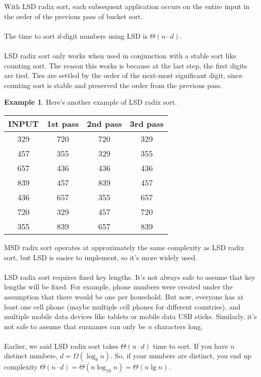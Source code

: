 \documentclass[]{article}
\theoremstyle{definition}
\newtheorem{ex}{Example}[section]
\begin{document}
					With LSD radix sort, each subsequent application occurs on the entire input in the order of the previous pass of bucket sort.
					\\ \\
					The time to sort $d$-digit numbers using LSD is $\Theta(n \cdot d)$.
					\\ \\
					LSD radix sort only works when used in conjunction with a stable sort like counting sort. The reason this works is because at the last step, the first digits are tied. Ties are settled by the order of the next-most significant digit, since counting sort is stable and preserved the order from the previous pass.
					\begin{ex} Here's another example of LSD radix sort. \\
						\begin{center}
							\begin{tabular}{|c|c|c|c|}
								\hline
								INPUT & 1st pass & 2nd pass & 3rd pass \\ \hline
								329 & 720 & 720 & 329 \\
								457 & 355 & 329 & 355 \\
								657 & 436 & 436 & 436 \\
								839 & 457 & 839 & 457 \\
								436 & 657 & 355 & 657 \\
								720 & 329 & 457 & 720 \\
								355 & 839 & 657 & 839 \\ \hline
							\end{tabular}
						\end{center}
					\end{ex}
					MSD radix sort operates at approximately the same complexity as LSD radix sort, but LSD is easier to implement, so it's more widely used.
					\\ \\
					LSD radix sort requires fixed key lengths. It's not always safe to assume that key lengths will be fixed. For example, phone numbers were created under the assumption that there would be one per household. But now, everyone has at least one cell phone (maybe multiple cell phones for different countries), and multiple mobile data devices like tablets or mobile data USB sticks. Similarly, it's not safe to assume that surnames can only be $n$ characters long.
					\\ \\
					Earlier, we said LSD radix sort takes $\Theta(n \cdot d)$ time to sort. If you have $n$ distinct numbers, $d = \Omega(\log_b n)$. So, if your numbers are distinct, you end up complexity $\Theta(n \cdot d) = \Theta(n \log_{10} n) = \Theta(n \lg n)$.
\end{document}
